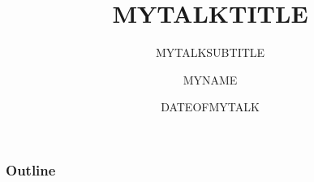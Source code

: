 \documentclass[t]{beamer}
\title{MYTALKTITLE}
\subtitle{MYTALKSUBTITLE}
\author{MYNAME}
\institute{MYINSTITUTION}
\date{DATEOFMYTALK}
\begin{document}
\begin{frame}
\titlepage
\end{frame}

\begin{frame}
\frametitle{Outline}
\tableofcontents
\end{frame}


\end{document}
